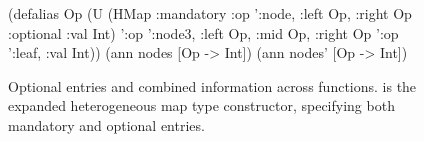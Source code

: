 \begin{figure}
\begin{cljlisting}
(defalias Op 
  (U (HMap :mandatory
           {:op ':node, :left Op, :right Op}
           :optional {:val Int})
     '{:op ':node3, :left Op, :mid Op, :right Op}
     '{:op ':leaf, :val Int}))
(ann nodes [Op -> Int])
(ann nodes' [Op -> Int])
\end{cljlisting}
\caption{Optional entries and combined information across functions.
   is the expanded heterogeneous map type constructor, specifying both
  mandatory and optional entries.
  }
\label{fig:infer:node3}
\end{figure}

%


% 





%


